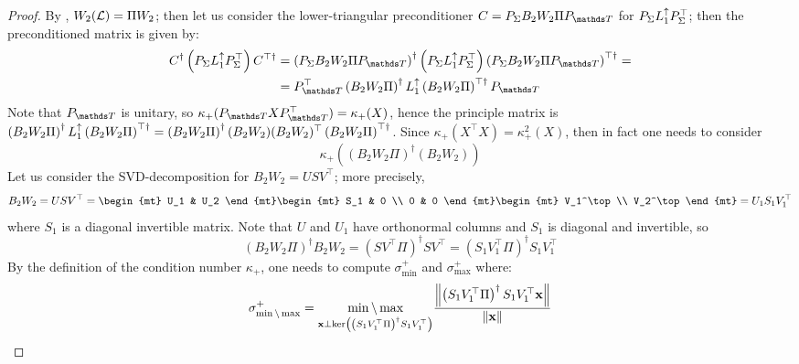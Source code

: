 \begin{proof}
By , \(W_2( \mathcal{L} ) = \Pi W_2\); then let us consider the lower-triangular preconditioner  \( C =  P_\Sigma B_2 W_2 \Pi P_{\ds T}  \) for \( P_\Sigma L_{1}^{\uparrow} P_\Sigma^\top  \); then the preconditioned matrix is given by:
\begin{equation*}
      \begin{aligned}
            C^\dagger \left( P_\Sigma \Lu 1 P_\Sigma^\top \right) C^{\top \dagger} & = \left( P_\Sigma B_2 W_2 \Pi P_{\ds T} \right)^\dagger \left( P_\Sigma \Lu 1 P_\Sigma^\top \right) \left( P_\Sigma B_2 W_2 \Pi P_{\ds T} \right)^{\top \dagger} = \\
            & = P_{\ds T}^\top \left( B_2 W_2 \Pi \right)^\dagger 
              \Lu 1 \left( B_2 W_2 \Pi  \right)^{\top \dagger} P_{\ds T}
      \end{aligned}
\end{equation*}
Note that \( P_{ \ds T } \) is unitary, so \( \kappa_+ ( P_{ \ds T } X P_{ \ds T }^\top ) = \kappa_+ ( X ) \), hence the principle matrix is \( \left( B_2 W_2 \Pi \right)^\dagger L_{1}^{\uparrow} \left( B_2 W_2 \Pi \right)^{\top \dagger} = \left( B_2 W_2 \Pi \right)^\dagger ( B_2 W_2 ) ( B_2 W_2 )^\top \left( B_2 W_2 \Pi  \right)^{\top \dagger}  \).
Since \( \kappa_+ ( X^\top X ) = \kappa_+^2( X ) \), then in fact one needs to consider
\[
       \kappa_+ \left( \left( B_2 W_2 \Pi \right)^\dagger ( B_2 W_2 ) \right)
\]
Let us consider the SVD-decomposition for \(  B_2 W_2 = U S V^\top \); more precisely,
\begin{equation*}
      B_2 W_2 = U S V^\top = \begin{mt} U_1 & U_2 \end{mt} \begin{mt} S_1 & 0 \\ 0 & 0 \end{mt} \begin{mt} V_1^\top \\ V_2^\top \end{mt} = U_1 S_1 V_1^\top
\end{equation*}
where \( S_1 \) is a diagonal invertible matrix. Note that \( U \) and \( U_1 \) have orthonormal columns and \( S_1 \) is diagonal and invertible, so
\begin{equation*}
      (  B_2 W_2 \Pi )^\dagger  B_2 W_2 = \left( S V^\top \Pi \right)^\dagger S V^\top = \left( S_1 V_1^\top \Pi \right)^\dagger S_1 V_1^\top %
\end{equation*}
By the definition of the condition number \( \kappa_+ \), one needs to compute \( \sigma^+_{\min}\) and \( \sigma^+_{\max}\) where:
\begin{equation*}
      \sigma^+_{\min \backslash \max} = \underset{ \mathbf{x} \perp \ker \left( \left( S_1 V_1^\top \Pi \right)^\dagger S_1 V_1^\top \right) }{\min \backslash \max} \frac{ \left\| \left( S_1 V_1^\top \Pi \right)^\dagger S_1 V_1^\top \mathbf{x} \right\| }{ \| \mathbf{x} \| }
\end{equation*}


\end{proof}
